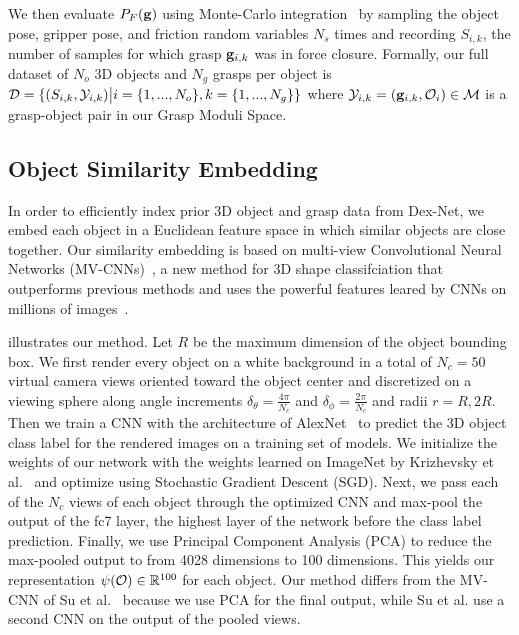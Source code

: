 We then evaluate $P_F(\mathbf{g})$ using Monte-Carlo integration~\cite{kehoe2012toward} by sampling the object pose, gripper pose, and friction random variables $N_s$ times and recording $S_{i,k}$, the number of samples for which grasp $\mathbf{g}_{i,k}$ was in force closure.
Formally, our full dataset of $N_o$ 3D objects and $N_g$ grasps per object is $\mathcal{D} = \{ (S_{i, k}, \mathcal{Y}_{i, k}) \big| i = \{1, ..., N_o\}, k = \{1, ..., N_g\} \}$ where $\mathcal{Y}_{i,k} = (\mathbf{g}_{i, k}, \mathcal{O}_i) \in \mathcal{M}$ is a grasp-object pair in our Grasp Moduli Space.



\subsection{Object Similarity Embedding}
In order to efficiently index prior 3D object and grasp data from Dex-Net, we embed each object in a Euclidean feature space in which similar objects are close together.
Our similarity embedding is based on multi-view Convolutional Neural Networks (MV-CNNs)~\cite{su2015multi}, a new method for 3D shape classifciation that outperforms previous methods and uses the powerful features leared by CNNs on millions of images~\cite{krizhevsky2012imagenet}.
 
 illustrates our method.
Let $R$ be the maximum dimension of the object bounding box.
We first render every object on a white background in a total of $N_c = 50$ virtual camera views oriented toward the object center and discretized on a viewing sphere along angle increments $\delta_{\theta} = \frac{4 \pi}{N_c}$ and $\delta_{\phi} = \frac{2 \pi}{N_c}$ and radii $r = R, 2R$.
Then we train a CNN with the architecture of AlexNet~\cite{krizhevsky2012imagenet} to predict the 3D object class label for the rendered images on a training set of models. 
We initialize the weights of our network with the weights learned on ImageNet by Krizhevsky et al.~\cite{krizhevsky2012imagenet} and optimize using Stochastic Gradient Descent (SGD). 
Next, we pass each of the $N_c$ views of each object through the optimized CNN and max-pool the output of the fc7 layer, the highest layer of the network before the class label prediction. 
Finally, we use Principal Component Analysis (PCA) to reduce the max-pooled output to from 4028 dimensions to 100 dimensions.
This yields our representation $\psi(\mathcal{O}) \in \mathbb{R}^{100}$ for each object.
Our method differs from the MV-CNN of Su et al.~\cite{su2015multi} because we use PCA for the final output, while Su et al. use a second CNN on the output of the pooled views. 

